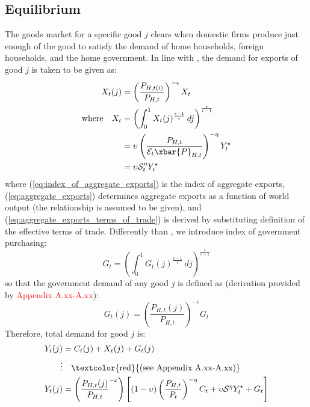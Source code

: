 \subsection{Equilibrium}
The goods market for a specific good $j$ clears when domestic firms produce just enough of the good to satisfy the demand of home households, foreign households, and the home government. In line with \textcite{jordigal_2015_monetary}, the demand for exports of good $j$ is taken to be given as:
\begin{align}
    X_t(j) &= \left(\frac{P_{H,t(i)}}{P_{H,t}}\right)^{-\epsilon} X_t\\
    \text{where} \quad X_t &= \left( \int_{0}^{1} X_t(j)^{\frac{\epsilon-1}{\epsilon}} \, dj\right)^{\frac{\epsilon}{\epsilon-1}} \label{eq:index_of_aggregate_exports}\\
    & =\upsilon\left( \frac{P_{H,t}}{\mathcal{E}_t \xbar{P}_{H,t}}\right)^{-\eta}Y^\star_t \label{eq:aggregate_exports}\\
    & = \upsilon \mathcal{S}_t^{\eta}Y^\star_t \label{eq:aggregate_exports_terms_of_trade}
\end{align} 
where (\ref{eq:index_of_aggregate_exports}) is the index of aggregate exports, (\ref{eq:aggregate_exports}) determines aggregate exports as a function of world output (the relationship is assumed to be given), and (\ref{eq:aggregate_exports_terms_of_trade}) is derived by substituting definition of the effective terms of trade. Differently than \citereset\textcite{jordigal_2015_monetary}, we introduce index of government purchasing:
\begin{equation}
    G_t = \left( \int_{0}^{1} {G_t(j)}^{\frac{\epsilon-1}{\epsilon}} \, dj\right)^{\frac{\epsilon}{\epsilon-1}}
\end{equation}
so that the government demand of any good $j$ is defined as (derivation provided by \textcolor{red}{Appendix A.xx-A.xx}):
\begin{equation}
    G_t(j) = \left( \frac{P_{H,t}(j)}{P_{H,t}} \right)^{-\epsilon} G_t
\end{equation}
Therefore, total demand for good $j$ is:
\begin{align}
    Y_t(j) &= C_t(j) + X_t(j) + G_t(j) \label{eq:demand_for_one_good}\\
    \vdots & \quad \text{\textcolor{red}{(see Appendix A.xx-A.xx)}} \\
    Y_t(j) &= \left(\frac{P_{H,t}(j)}{P_{H,t}}^{-\varepsilon}\right) \left[ (1-\upsilon)\left(\frac{P_{H,t}}{P_t}\right)^{-\eta}C_t + \upsilon \mathcal{S}^\eta Y^\star_t + G_t\right]
\end{align}
